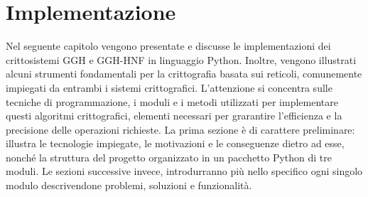 \chapter{Implementazione}
Nel seguente capitolo vengono presentate e discusse le implementazioni dei crittosistemi 
GGH e GGH-HNF in linguaggio Python. Inoltre, vengono illustrati alcuni strumenti fondamentali 
per la crittografia basata sui reticoli, comunemente impiegati da entrambi i sistemi crittografici.
L'attenzione si concentra sulle tecniche di programmazione, i moduli e i metodi utilizzati
per implementare questi algoritmi crittografici, elementi necessari per
grarantire l'efficienza e la precisione delle operazioni richieste. 
La prima sezione è di carattere preliminare: 
illustra le tecnologie impiegate, le motivazioni e le conseguenze dietro ad esse, 
nonché la struttura del progetto organizzato in un pacchetto Python di tre moduli. 
Le sezioni successive invece, introdurranno più nello specifico ogni singolo modulo descrivendone
problemi, soluzioni e funzionalità.
\label{cap:Implementazione}
%
%

%
%

%
%

%
%


